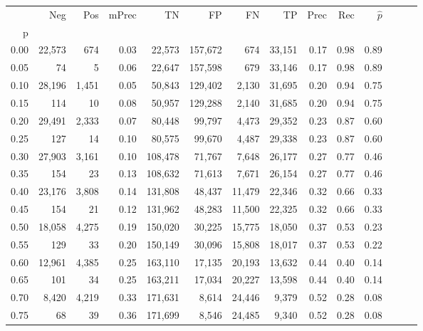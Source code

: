 \begin{tabular}{rrrrrrrrrrrrrr}
\toprule
{} &     Neg &    Pos & mPrec &       TN &       FP &      FN &      TP &  Prec &   Rec & $\hat{p}$ \\
p    &         &        &       &          &          &         &         &       &       &           \\
\midrule
0.00 &  22,573 &    674 &  0.03 &   22,573 &  157,672 &     674 &  33,151 &  0.17 &  0.98 &      0.89 \\
0.05 &      74 &      5 &  0.06 &   22,647 &  157,598 &     679 &  33,146 &  0.17 &  0.98 &      0.89 \\
0.10 &  28,196 &  1,451 &  0.05 &   50,843 &  129,402 &   2,130 &  31,695 &  0.20 &  0.94 &      0.75 \\
0.15 &     114 &     10 &  0.08 &   50,957 &  129,288 &   2,140 &  31,685 &  0.20 &  0.94 &      0.75 \\
0.20 &  29,491 &  2,333 &  0.07 &   80,448 &   99,797 &   4,473 &  29,352 &  0.23 &  0.87 &      0.60 \\
0.25 &     127 &     14 &  0.10 &   80,575 &   99,670 &   4,487 &  29,338 &  0.23 &  0.87 &      0.60 \\
0.30 &  27,903 &  3,161 &  0.10 &  108,478 &   71,767 &   7,648 &  26,177 &  0.27 &  0.77 &      0.46 \\
0.35 &     154 &     23 &  0.13 &  108,632 &   71,613 &   7,671 &  26,154 &  0.27 &  0.77 &      0.46 \\
0.40 &  23,176 &  3,808 &  0.14 &  131,808 &   48,437 &  11,479 &  22,346 &  0.32 &  0.66 &      0.33 \\
0.45 &     154 &     21 &  0.12 &  131,962 &   48,283 &  11,500 &  22,325 &  0.32 &  0.66 &      0.33 \\
0.50 &  18,058 &  4,275 &  0.19 &  150,020 &   30,225 &  15,775 &  18,050 &  0.37 &  0.53 &      0.23 \\
0.55 &     129 &     33 &  0.20 &  150,149 &   30,096 &  15,808 &  18,017 &  0.37 &  0.53 &      0.22 \\
0.60 &  12,961 &  4,385 &  0.25 &  163,110 &   17,135 &  20,193 &  13,632 &  0.44 &  0.40 &      0.14 \\
0.65 &     101 &     34 &  0.25 &  163,211 &   17,034 &  20,227 &  13,598 &  0.44 &  0.40 &      0.14 \\
0.70 &   8,420 &  4,219 &  0.33 &  171,631 &    8,614 &  24,446 &   9,379 &  0.52 &  0.28 &      0.08 \\
0.75 &      68 &     39 &  0.36 &  171,699 &    8,546 &  24,485 &   9,340 &  0.52 &  0.28 &      0.08 \\

\end{tabular}
